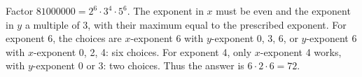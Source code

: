 Factor $ 81000000=2^6\cdot3^4\cdot5^6 $. The exponent in $ x $ must be even and the exponent in $ y $ a multiple of 3, with their maximum equal to the prescribed exponent. For exponent 6, the choices are $ x $-exponent 6 with $ y $-exponent 0, 3, 6, or $ y $-exponent 6 with $ x $-exponent 0, 2, 4: six choices. For exponent 4, only $ x $-exponent 4 works, with $ y $-exponent 0 or 3: two choices. Thus the answer is $ 6\cdot2\cdot6=\boxed{72}$.
